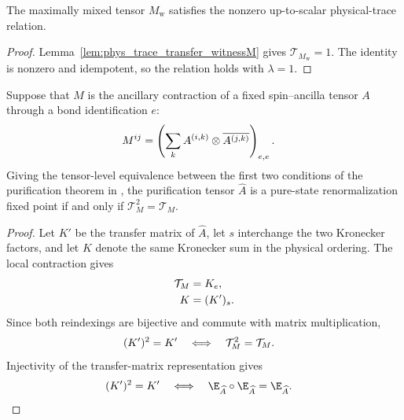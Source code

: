 \begin{lemma}
    \label{thm:witness_source_zcl}
    \leanok
    The maximally mixed tensor $M_{\mathrm w}$ satisfies the nonzero
    up-to-scalar physical-trace relation.
\end{lemma}
\begin{proof}\leanok
    Lemma~\ref{lem:phys_trace_transfer_witnessM} gives
    $\mathcal T_{M_{\mathrm w}}=1$. The identity is nonzero and idempotent, so
    the relation holds with $\lambda=1$.
\end{proof}

\begin{lemma}
    \label{thm:purification_tensor_rfp_iff_physical_trace_idempotent}
    \leanok
    Suppose that $M$ is the ancillary contraction of a fixed spin--ancilla
    tensor $A$ through a bond identification $e$:
    \begin{align}
        M^{ij}
         & =
        \left(\sum_k A^{(i,k)}\otimes
        \overline{A^{(j,k)}}\right)_{e,e}.
        \notag
    \end{align}
    Giving the tensor-level equivalence between the first two conditions of the
    purification theorem in \cite[lines~744--786]{Cirac2016MPDO_arXiv}, the
    purification tensor $\widehat A$ is a pure-state renormalization fixed
    point if and only if $\mathcal T_M^2=\mathcal T_M$.
\end{lemma}

\begin{proof}
    \leanok
    Let $K'$ be the transfer matrix of $\widehat A$, let $s$ interchange the
    two Kronecker factors, and let $K$ denote the same Kronecker sum in the
    physical ordering. The local contraction gives
    \begin{align}
        \mathcal T_M & =K_e,
        \notag                  \\
        K            & =(K')_s.
        \notag
    \end{align}
    Since both reindexings are bijective and commute with matrix
    multiplication,
    \begin{align}
        (K')^2=K'
        \quad & \Longleftrightarrow\quad
        \mathcal T_M^2=\mathcal T_M.
        \notag
    \end{align}
    Injectivity of the transfer-matrix representation gives
    \begin{align}
        (K')^2=K'
        \quad & \Longleftrightarrow\quad
        \E_{\widehat A}\circ\E_{\widehat A}
        =\E_{\widehat A}.
        \notag
    \end{align}
\end{proof}

